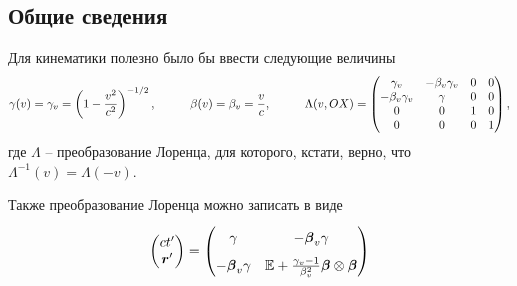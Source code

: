 \subsection*{Общие сведения}

Для кинематики полезно было бы ввести следующие величины
\begin{equation*}
    \gamma(v) = \gamma_v = \left(1 - \frac{v^2}{c^2}\right)^{-1/2},
    \hspace{1 cm}
    \beta(v) = \beta_v = \frac{v}{c},
    \hspace{1 cm}
    \Lambda(v, OX) = \begin{pmatrix}
        \gamma_v & - \beta_v \gamma_v & 0 & 0\\
        - \beta_v \gamma_v & \gamma & 0 & 0\\
        0 & 0 & 1 & 0\\
        0 & 0 & 0 & 1\\
    \end{pmatrix},
\end{equation*}
где $\Lambda$ -- преобразование Лоренца, для которого, кстати, верно, что $\Lambda^{-1} (v) = \Lambda(-v)$.

Также преобразование Лоренца можно записать в виде
\begin{equation}
\label{LORENTS}
    \begin{pmatrix}
        c t' \\ \vc{r}'
    \end{pmatrix} = 
    \begin{pmatrix}
        \gamma & - \vc{\beta}_v \gamma 
        \vphantom{\dfrac{1}{2}} \\
        - \vc{\beta}_v \gamma & \mathbb{E} + \frac{\gamma_v - 1}{\beta_v^2} \vc{\beta} \otimes \vc{\beta}  
        \vphantom{\dfrac{1}{2}} \\
    \end{pmatrix}
\end{equation}